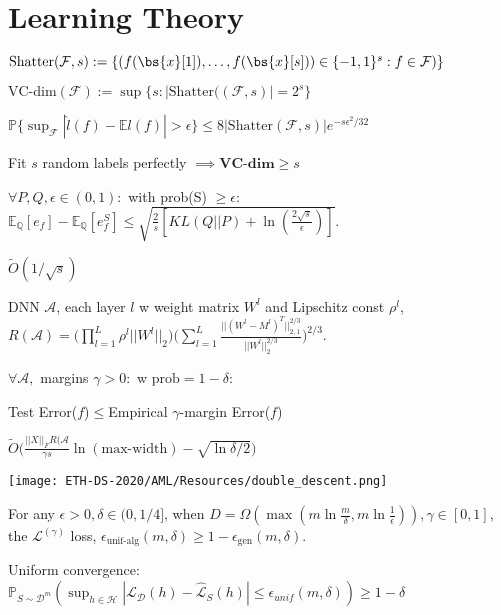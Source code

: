 \section{Learning Theory}
 $\text{Shatter}(\mathcal{F},s):=\{(f(\bs{x}[1]),\dots,f(\bs{x}[s]))\in \{-1,1\}^s : f\in\mathcal{F})\}$

 $\text{VC-dim}(\mathcal{F}):=\sup \{s:|\text{Shatter}((\mathcal{F},s)|=2^s\}$

$\mathbb{P}\{\sup_{\mathcal{F}} |\hat{l}(f)- \mathbb{E}l(f)|>\epsilon \}\le 8|\text{Shatter}(\mathcal{F},s)|e^{-s\epsilon^2/32}$

Fit $s$ random labels perfectly $\implies \textbf{VC-dim}\ge s$





 $\forall P, Q, \epsilon\in (0,1):$ with prob(S) $\ge\epsilon$:
$\mathbb{E}_{\mathbb{Q}}[e_f]-\mathbb{E}_{\mathbb{Q}}[e_f^S]\le \sqrt{\frac{2}{s}[KL(Q||P)+\ln (\frac{2\sqrt{s}}{\epsilon})]}.$

$\tilde{O}(1/\sqrt{s})$

DNN $\mathcal{A}$, each layer $l$ w weight matrix $W^l$ and Lipschitz const $\rho^l$,
$R(\mathcal{A})=\Big(\prod^L_{l=1}\rho^l||W^l||_2\Big)\Big(\sum^L_{l=1}\frac{||(W^l-M^l)^T||^{2/3}_{2,1}}{||W^l||_2^{2/3}}\Big)^{2/3}.$

 $\forall\mathcal{A},$ margins $\gamma>0:$ w $\text{prob}=1-\delta:$

Test Error($f$)$\le$Empirical $\gamma$-margin Error($f$)

$\tilde{O}\big(\frac{||X||_F R(\mathcal{A}}{\gamma s}\ln(\text{max-width})-\sqrt{\ln\delta/2}\big)$

\texttt{[image: ETH-DS-2020/AML/Resources/double\_descent.png]}

 For any $\epsilon>0,\delta\in (0,1/4]$, when $D=\Omega(\max(m\ln\frac{m}{\delta},m\ln\frac{1}{\epsilon})),\gamma\in[0,1]$, the $\mathcal{L}^{(\gamma)}$ loss, $\epsilon_{\text{unif-alg}}(m,\delta)\ge 1-\epsilon_{\text{gen}}(m,\delta)$.

Uniform convergence:
$\mathbb{P}_{S\sim\mathcal{D}^m}(\sup_{h\in\mathcal{H}}|\mathcal{L}_{\mathcal{D}}(h)-\hat{\mathcal{L}}_S(h)|\le \epsilon_{unif}(m,\delta))\ge 1-\delta$